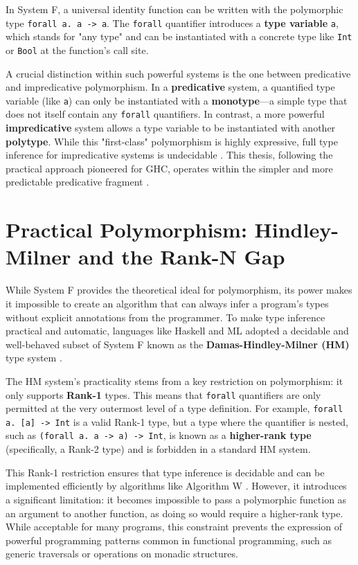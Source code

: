 In System F, a universal identity function can be written with the polymorphic type \texttt{forall a. a -> a}. The \texttt{forall} quantifier introduces a \textbf{type variable} \texttt{a}, which stands for "any type" and can be instantiated with a concrete type like \texttt{Int} or \texttt{Bool} at the function's call site.

A crucial distinction within such powerful systems is the one between predicative and impredicative polymorphism. In a \textbf{predicative} system, a quantified type variable (like \texttt{a}) can only be instantiated with a \textbf{monotype}---a simple type that does not itself contain any \texttt{forall} quantifiers. In contrast, a more powerful \textbf{impredicative} system allows a type variable to be instantiated with another \textbf{polytype}. While this "first-class" polymorphism is highly expressive, full type inference for impredicative systems is undecidable \cite{wells-typability-1999, serrano-quick-2020}. This thesis, following the practical approach pioneered for GHC, operates within the simpler and more predictable predicative fragment \cite{jones-practical-2007}.

\section{Practical Polymorphism: Hindley-Milner and the Rank-N Gap}
\label{sec:LitReviewHM}

While System F provides the theoretical ideal for polymorphism, its power makes it impossible to create an algorithm that can always infer a program's types without explicit annotations from the programmer. To make type inference practical and automatic, languages like Haskell and ML adopted a decidable and well-behaved subset of System F known as the \textbf{Damas-Hindley-Milner (HM)} type system \cite{damas-milner}.

The HM system's practicality stems from a key restriction on polymorphism: it only supports \textbf{Rank-1} types. This means that \texttt{forall} quantifiers are only permitted at the very outermost level of a type definition. For example, \texttt{forall a. [a] -> Int} is a valid Rank-1 type, but a type where the quantifier is nested, such as \texttt{(forall a. a -> a) -> Int}, is known as a \textbf{higher-rank type} (specifically, a Rank-2 type) and is forbidden in a standard HM system.

This Rank-1 restriction ensures that type inference is decidable and can be implemented efficiently by algorithms like Algorithm W \cite{jones-practical-2007}. However, it introduces a significant limitation: it becomes impossible to pass a polymorphic function as an argument to another function, as doing so would require a higher-rank type. While acceptable for many programs, this constraint prevents the expression of powerful programming patterns common in functional programming, such as generic traversals or operations on monadic structures.

